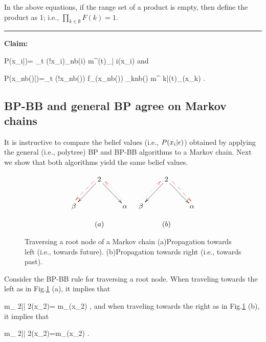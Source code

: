 In the above
equations, if the
range set of a product is empty, then
 define the product as 1; i.e.,
$\prod_{k\in \emptyset}F(k)=1$.



\hrule\noindent
{\bf Claim:}

\beq
P(x_i|\eps)=
\lim_{t\rarrow
\infty}\caln(!x_i)\prod_{\alp\in nb(i)}
m^{(t)}_{\alp| i}(x_i)
\;
\label{eq-m-prod}
\eeq
and

\beq
P(x_{nb(\alp)}|\eps)=\lim_{t\rarrow \infty}
\caln(!x_{nb(\alp)})
f_\alp(x_{nb(\alp)})
\prod_{k\in nb(\alp)}
m^{ k|(t)}_{\alp}(x_k)
\;.
\label{eq-f-m-prod}
\eeq


\subsection{BP-BB and general BP agree on Markov chains}

It is instructive to
compare the belief values (i.e., $P(x_i|\epsilon)$)
obtained by
 applying the
general (i.e., polytree)  BP
and  BP-BB algorithms  to a Markov chain.
Next we show that both algorithms
yield the same belief values.

\begin{figure}[h!]
$$
\begin{array}{cc}
\xymatrix{
&2\ar[dr]\ar[dl]\ar@[red]@{-->}@<-1ex>[dl]
\\
\beta
&&\alp\ar@[red]@{.>}@<-1ex>[ul]
}
&
\xymatrix{
&2\ar[dr]\ar[dl]\ar@[red]@{-->}@<1ex>[dr]
\\
\beta\ar@[red]@{.>}@<1ex>[ur]
&&\alp
}
\\
\\
(a)&(b)
\end{array}
$$
\caption{Traversing a root node of a Markov chain
(a)Propagation towards left (i.e., towards future).
(b)Propagation towards right (i.e., towards past).}
\label{fig-mp-markov-trans-root}
\end{figure}

Consider
the BP-BB rule for traversing a root node.
When traveling
towards the left
as in Fig.\ref{fig-mp-markov-trans-root} (a),
it implies that

\beq
m_{ 2|\alp | 2}(x_2)= m_{\beta }(x_2)
\;,
\eeq
and
when traveling
towards the right
as in Fig.\ref{fig-mp-markov-trans-root} (b),
it implies that

\beq
m_{ 2|\beta| 2}(x_2)=m_{\alp}(x_2)
\;.
\eeq



